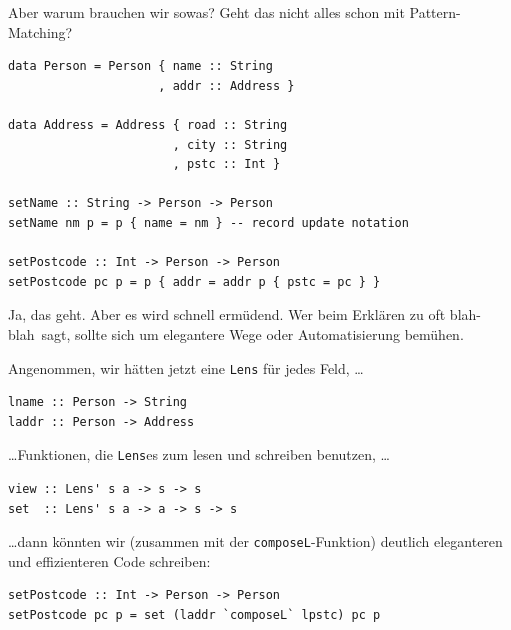 \documentclass{beamer}
\begin{document}
\begin{frame}[fragile]

Aber warum brauchen wir sowas? Geht das nicht alles schon mit Pattern-Matching?
\pause

\begin{verbatim}
data Person = Person { name :: String
                     , addr :: Address }
                     
data Address = Address { road :: String
                       , city :: String
                       , pstc :: Int }
                       
setName :: String -> Person -> Person 
setName nm p = p { name = nm } -- record update notation

setPostcode :: Int -> Person -> Person
setPostcode pc p = p { addr = addr p { pstc = pc } }
\end{verbatim}

Ja, das geht. Aber es wird schnell ermüdend. Wer beim Erklären zu oft \glqq blah-blah\grqq\ sagt, sollte sich um elegantere Wege oder Automatisierung bemühen.

\end{frame}


\begin{frame}[fragile]

Angenommen, wir hätten jetzt eine \texttt{Lens} für jedes Feld, \dots

\begin{verbatim}
lname :: Person -> String
laddr :: Person -> Address
\end{verbatim}
\pause

\dots Funktionen, die \texttt{Lens}es zum lesen und schreiben benutzen, \dots

\begin{verbatim}
view :: Lens' s a -> s -> s
set  :: Lens' s a -> a -> s -> s
\end{verbatim}
\pause

\dots dann könnten wir (zusammen mit der \texttt{composeL}-Funktion) deutlich eleganteren und effizienteren Code schreiben:\bigskip

\begin{verbatim}
setPostcode :: Int -> Person -> Person
setPostcode pc p = set (laddr `composeL` lpstc) pc p
\end{verbatim}

\end{frame}
\end{document}

